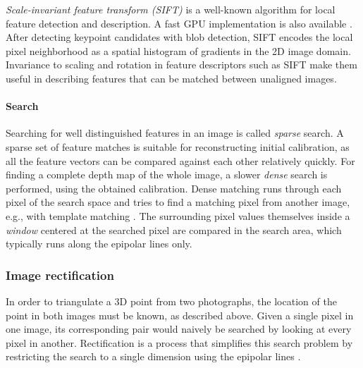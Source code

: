 \emph{Scale-invariant feature transform (SIFT)} \cite{lowe1999object} is a well-known algorithm for local feature detection and description.
A fast GPU implementation is also available \cite{changchang2007siftgpu}.
After detecting keypoint candidates with blob detection, SIFT encodes the local pixel neighborhood as a spatial histogram of gradients in the 2D image domain.
Invariance to scaling and rotation in feature descriptors such as SIFT make them useful in describing features that can be matched between unaligned images.

\paragraph{Search}
Searching for well distinguished features in an image is called \emph{sparse} search.
A sparse set of feature matches is suitable for reconstructing initial calibration, as all the feature vectors can be compared against each other relatively quickly.
For finding a complete depth map of the whole image, a slower \emph{dense} search is performed, using the obtained calibration.
Dense matching runs through each pixel of the search space and tries to find a matching pixel from another image, e.g., with template matching \cite{duda1973pattern}.
The surrounding pixel values themselves inside a \emph{window} centered at the searched pixel are compared in the search area, which typically runs along the epipolar lines only.



\subsubsection{Image rectification} %


In order to triangulate a 3D point from two photographs, the location of the point in both images must be known, as described above.
Given a single pixel in one image, its corresponding pair would naively be searched by looking at every pixel in another.
Rectification is a process that simplifies this search problem by restricting the search to a single dimension using the epipolar lines \cite[p.~157]{trucco1998introductory} \cite[ch.~7.1]{pollefeys2004visual}.

